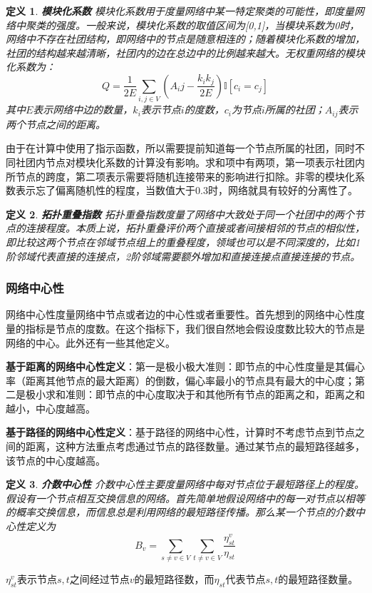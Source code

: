 \documentclass{ctexart}
\newtheorem{Definition}{\hspace{2em}定义}[section]
\begin{document}
                \begin{Definition}
                    \textbf{模块化系数} 模块化系数用于度量网络中某一特定聚类的可能性，即度量网络中聚类的强度。一般来说，模块化系数的取值区间为[0,1]，当模块系数为0时，网络中不存在社团结构，即网络中的节点是随意相连的；随着模块化系数的增加，社团的结构越来越清晰，社团内的边在总边中的比例越来越大。无权重网络的模块化系数为：
                    $$
                        Q = \frac{1}{2E}\sum_{i,j\in V} (A_ij - \frac{k_ik_j}{2E})\mathbb{I}[c_i=c_j]
                    $$
                    其中$E$表示网络中边的数量，$k_i$表示节点$i$的度数，$c_i$为节点$i$所属的社团；$A_{ij}$表示两个节点之间的距离。
                \end{Definition}
                由于在计算中使用了指示函数，所以需要提前知道每一个节点所属的社团，同时不同社团内节点对模块化系数的计算没有影响。求和项中有两项，第一项表示社团内所节点的跨度，第二项表示需要将随机连接带来的影响进行扣除。非零的模块化系数表示忘了偏离随机性的程度，当数值大于0.3时，网络就具有较好的分离性了。

                \begin{Definition}
                    \textbf{拓扑重叠指数} 拓扑重叠指数度量了网络中大致处于同一个社团中的两个节点的连接程度。本质上说，拓扑重叠评价两个直接或者间接相邻的节点的相似性，即比较这两个节点在邻域节点组上的重叠程度，领域也可以是不同深度的，比如1阶邻域代表直接的连接点，2阶邻域需要额外增加和直接连接点直接连接的节点。
                \end{Definition}
            \subsubsection{网络中心性}
                网络中心性度量网络中节点或者边的中心性或者重要性。首先想到的网络中心性度量的指标是节点的度数。在这个指标下，我们很自然地会假设度数比较大的节点是网络的中心。此外还有一些其他定义。

                \textbf{基于距离的网络中心性定义}：第一是极小极大准则：即节点的中心性度量是其偏心率（距离其他节点的最大距离）的倒数，偏心率最小的节点具有最大的中心度；第二是极小求和准则：即节点的中心度取决于和其他所有节点的距离之和，距离之和越小，中心度越高。

                \textbf{基于路径的网络中心性定义}：基于路径的网络中心性，计算时不考虑节点到节点之间的距离，这种方法重点考虑通过节点的路径数量。通过某节点的最短路径越多，该节点的中心度越高。

                \begin{Definition}
                    \textbf{介数中心性}  介数中心性主要度量网络中每对节点位于最短路径上的程度。假设有一个节点相互交换信息的网络。首先简单地假设网络中的每一对节点以相等的概率交换信息，而信息总是利用网络的最短路径传播。那么某一个节点的介数中心性定义为
                    $$
                        B_v = \sum_{s\ne v\in V}\sum_{t\ne v\in V}\frac{\eta_{st}^v}{\eta_{st}}
                    $$
                \end{Definition}
                $\eta_{st}^v$表示节点$s,t$之间经过节点$v$的最短路径数，而$\eta_{st}$代表节点$s,t$的最短路径数量。
\end{document}
